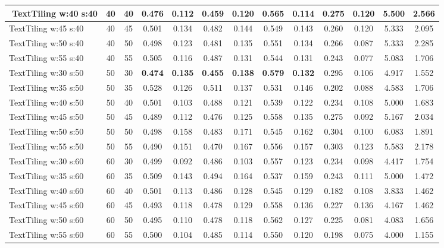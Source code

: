 \documentclass{article}
\begin{document}
\begin{longtable}[c]{|l|c|c|c|c|c|c|c|c|c|c|c|c|}
$$ TextTiling w:40 s:40 & 40 & 40 & 0.476 & 0.112 & 0.459 & 0.120 & 0.565 & 0.114 & 0.275 & 0.120 & 5.500 & 2.566  \\ \hline 
 TextTiling w:45 s:40 & 40 & 45 & 0.501 & 0.134 & 0.482 & 0.144 & 0.549 & 0.143 & 0.260 & 0.120 & 5.333 & 2.095  \\ \hline 
 TextTiling w:50 s:40 & 40 & 50 & 0.498 & 0.123 & 0.481 & 0.135 & 0.551 & 0.134 & 0.266 & 0.087 & 5.333 & 2.285  \\ \hline 
 TextTiling w:55 s:40 & 40 & 55 & 0.505 & 0.116 & 0.487 & 0.131 & 0.544 & 0.131 & 0.243 & 0.077 & 5.083 & 1.706  \\ \hline 
 TextTiling w:30 s:50 & 50 & 30 & \cellcolor{gray!20} \textbf{0.474} & \cellcolor{gray!20} \textbf{0.135} & \cellcolor{gray!20} \textbf{0.455} & \cellcolor{gray!20} \textbf{0.138} & \cellcolor{gray!20} \textbf{0.579} & \cellcolor{gray!20} \textbf{0.132} & 0.295 & 0.106 & 4.917 & 1.552  \\ \hline 
 TextTiling w:35 s:50 & 50 & 35 & 0.528 & 0.126 & 0.511 & 0.137 & 0.531 & 0.146 & 0.202 & 0.088 & 4.583 & 1.706  \\ \hline 
 TextTiling w:40 s:50 & 50 & 40 & 0.501 & 0.103 & 0.488 & 0.121 & 0.539 & 0.122 & 0.234 & 0.108 & 5.000 & 1.683  \\ \hline 
 TextTiling w:45 s:50 & 50 & 45 & 0.489 & 0.112 & 0.476 & 0.125 & 0.558 & 0.135 & 0.275 & 0.092 & 5.167 & 2.034  \\ \hline 
 TextTiling w:50 s:50 & 50 & 50 & 0.498 & 0.158 & 0.483 & 0.171 & 0.545 & 0.162 & 0.304 & 0.100 & 6.083 & 1.891  \\ \hline 
 TextTiling w:55 s:50 & 50 & 55 & 0.490 & 0.151 & 0.470 & 0.167 & 0.556 & 0.157 & 0.303 & 0.123 & 5.583 & 2.178  \\ \hline 
 TextTiling w:30 s:60 & 60 & 30 & 0.499 & 0.092 & 0.486 & 0.103 & 0.557 & 0.123 & 0.234 & 0.098 & 4.417 & 1.754  \\ \hline 
 TextTiling w:35 s:60 & 60 & 35 & 0.509 & 0.143 & 0.494 & 0.164 & 0.537 & 0.159 & 0.243 & 0.111 & 5.000 & 1.472  \\ \hline 
 TextTiling w:40 s:60 & 60 & 40 & 0.501 & 0.113 & 0.486 & 0.128 & 0.545 & 0.129 & 0.182 & 0.108 & 3.833 & 1.462  \\ \hline 
 TextTiling w:45 s:60 & 60 & 45 & 0.493 & 0.118 & 0.478 & 0.129 & 0.558 & 0.136 & 0.227 & 0.136 & 4.167 & 1.462  \\ \hline 
 TextTiling w:50 s:60 & 60 & 50 & 0.495 & 0.110 & 0.478 & 0.118 & 0.562 & 0.127 & 0.225 & 0.081 & 4.083 & 1.656  \\ \hline 
 TextTiling w:55 s:60 & 60 & 55 & 0.500 & 0.104 & 0.485 & 0.114 & 0.550 & 0.120 & 0.198 & 0.075 & 4.000 & 1.155  \\ \hline 
 \end{longtable} 
\end{document}

